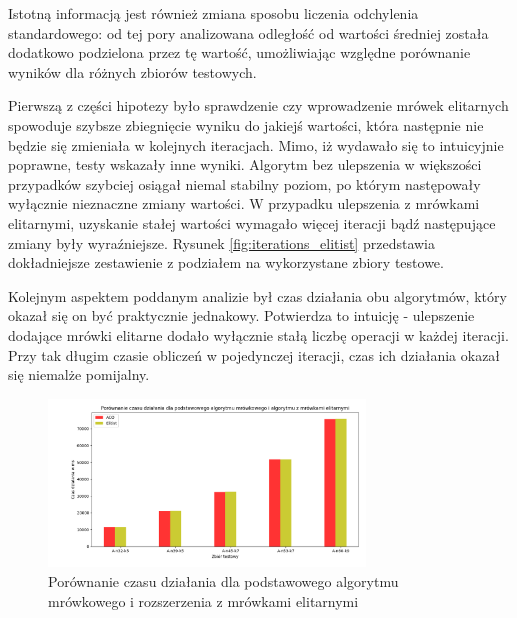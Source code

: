 \documentclass[10pt]{article}
\begin{document}
Istotną informacją jest również zmiana sposobu liczenia odchylenia standardowego: od tej pory analizowana odległość od wartości średniej została dodatkowo podzielona przez tę wartość, umożliwiając względne porównanie wyników dla różnych zbiorów testowych.  

Pierwszą z części hipotezy było sprawdzenie czy wprowadzenie mrówek elitarnych spowoduje szybsze zbiegnięcie wyniku do jakiejś wartości, która następnie nie będzie się zmieniała w kolejnych iteracjach. Mimo, iż wydawało się to intuicyjnie poprawne, testy wskazały inne wyniki. Algorytm bez ulepszenia w większości przypadków szybciej osiągał niemal stabilny poziom, po którym następowały wyłącznie nieznaczne zmiany wartości. W przypadku ulepszenia z mrówkami elitarnymi, uzyskanie stałej wartości wymagało więcej iteracji bądź następujące zmiany były wyraźniejsze. Rysunek \ref{fig:iterations_elitist} przedstawia dokładniejsze zestawienie z podziałem na wykorzystane zbiory testowe.

Kolejnym aspektem poddanym analizie był czas działania obu algorytmów, który okazał się on być praktycznie jednakowy. Potwierdza to intuicję - ulepszenie dodające mrówki elitarne dodało wyłącznie stałą liczbę operacji w każdej iteracji. Przy tak długim czasie obliczeń w pojedynczej iteracji, czas ich działania okazał się niemalże pomijalny.

\begin{figure}[H]
    \centering
    \includegraphics[width=0.75\textwidth]{time_elitist.png}
    \caption{Porównanie czasu działania dla podstawowego algorytmu mrówkowego i rozszerzenia z mrówkami elitarnymi}
    \label{fig:time_elitist}
\end{figure}
\end{document}

